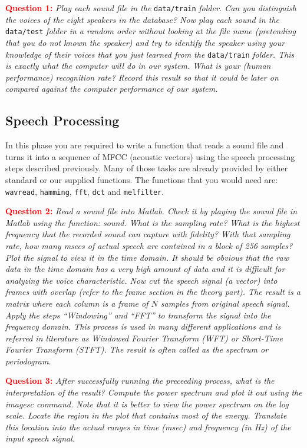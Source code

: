 \documentclass{article}
\begin{document}
\textcolor{red}{\textbf{Question 1:}} \textit{Play each sound file in the }\texttt{data/train} \textit{folder.  Can you distinguish the voices of the eight speakers in the database?  Now play each sound in the} \texttt{data/test} \textit{folder in a random order without looking at the file name (pretending that you do not known the speaker) and try to identify the speaker using your knowledge of their voices that you just learned from the} \texttt{data/train} \textit{folder.  This is exactly what the computer will do in our system.  What is your (human performance) recognition rate?  Record this result so that it could be later on compared against the computer performance of our system.}

\subsection{Speech Processing}
In this phase you are required to write a function that reads a sound file and turns it into a sequence of MFCC (acoustic vectors) using the speech processing steps described previously. Many of those tasks are already provided by either standard or our supplied functions.  The functions that you would need are: \texttt{wavread}, \texttt{hamming}, \texttt{fft}, \texttt{dct} and \texttt{melfilter}.  

\textcolor{red}{\textbf{Question 2:}} \textit{Read a sound file into Matlab.  Check it by playing the sound file in Matlab using the function: sound.  What is the sampling rate?  What is the highest frequency that the recorded sound can capture with fidelity? With that sampling rate, how many msecs of actual speech are contained in a block of 256 samples? Plot the signal to view it in the time domain.  It should be obvious that the raw data in the time domain has a very high amount of data and it is difficult for analyzing the voice characteristic.
Now cut the speech signal (a vector) into frames with overlap (refer to the frame section in the theory part).  The result is a matrix where each column is a frame of $N$ samples from original speech signal.  Apply the steps “Windowing” and “FFT” to transform the signal into the frequency domain.  This process is used in many different applications and is referred in literature as Windowed Fourier Transform (WFT) or Short-Time Fourier Transform (STFT).  The result is often called as the spectrum or periodogram.}

\textcolor{red}{\textbf{Question 3:}} \textit{After successfully running the preceeding process, what is the interpretation of the result?  Compute the power spectrum and plot it out using the imagesc command.  Note that it is better to view the power spectrum on the log scale.  Locate the region in the plot that contains most of the energy.  Translate this location into the actual ranges in time (msec) and frequency (in Hz) of the input speech signal.}
\end{document}
